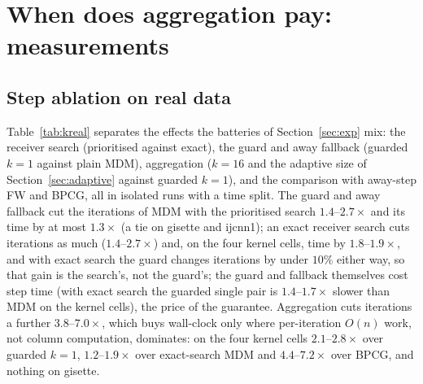 \section{When does aggregation pay: measurements}\label{sec:pay-meas}

\subsection{Step ablation on real data}\label{sec:meas-kreal}
Table~\ref{tab:kreal} separates the effects the batteries of
Section~\ref{sec:exp} mix: the receiver search (prioritised against
exact), the guard and away fallback (guarded $k{=}1$ against plain MDM),
aggregation ($k{=}16$ and the adaptive size of
Section~\ref{sec:adaptive} against guarded $k{=}1$), and the comparison
with away-step FW and BPCG, all in isolated runs with a time split. The
guard and away fallback cut the iterations of MDM with the prioritised
search $1.4$--$2.7\times$ and its time by at most $1.3\times$ (a tie on
gisette and ijcnn1); an exact receiver search cuts iterations as much
($1.4$--$2.7\times$) and, on the four kernel cells, time by
$1.8$--$1.9\times$, and with exact search the guard changes iterations by
under $10\%$ either way, so that gain is the search's, not the guard's;
the guard and fallback themselves cost step time (with exact search the
guarded single pair is $1.4$--$1.7\times$ slower than MDM on the kernel
cells), the price of the guarantee. Aggregation cuts iterations a further
$3.8$--$7.0\times$, which buys wall-clock only where per-iteration
$O(n)$ work, not column computation, dominates: on the four kernel cells
$2.1$--$2.8\times$ over guarded $k{=}1$, $1.2$--$1.9\times$ over
exact-search MDM and $4.4$--$7.2\times$ over BPCG, and nothing on
gisette.

